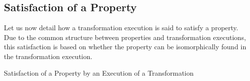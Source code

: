 %

\subsection{Satisfaction of a Property}
\label{sec:prop_satisfaction}

Let us now detail how a transformation execution is said to satisfy a property. Due to the common structure between properties and transformation executions, this satisfaction is based on whether the property can be isomorphically found in the transformation execution.

\begin{definition}{Satisfaction of a Property by an Execution of a Transformation\\}
\label{def:sat_prop_ex}
\end{definition}

